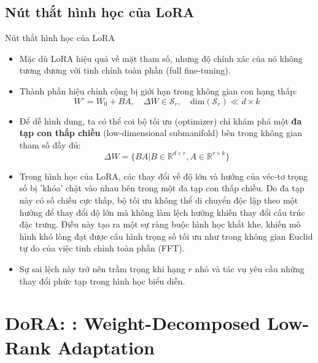 \documentclass[11pt,aspectratio=169]{beamer}
\begin{document}
\subsection{Nút thắt hình học của LoRA}
\begin{frame}[t]{Nút thắt hình học của LoRA}
\footnotesize

\begin{itemize}
    \item Mặc dù LoRA hiệu quả về mặt tham số, nhưng độ chính xác của nó không tương đương với tinh chỉnh toàn phần (full fine-tuning).
    \item Thành phần hiệu chỉnh cộng bị giới hạn trong không gian con hạng thấp:
    $$
        W' = W_0 + BA, \quad \Delta W \in \mathcal{S}_r, \quad \text{dim}(\mathcal{S}_r) \ll d \times k
    $$
    \item Để dễ hình dung, ta có thể coi bộ tối ưu (optimizer) chỉ khám phá một \textbf{đa tạp con thấp chiều} (low-dimensional submanifold) bên trong không gian tham số đầy đủ:
    $$\Delta W = \{BA | B \in \mathbb{R}^{d \times r}, A \in \mathbb{R}^{r \times k}\}$$
    \item Trong hình học của LoRA, các thay đổi về độ lớn và hướng của véc-tơ trọng số bị 'khóa' chặt vào nhau bên trong một đa tạp con thấp chiều. Do đa tạp này có số chiều cực thấp, bộ tối ưu không thể di chuyển độc lập theo một hướng để thay đổi độ lớn mà không làm lệch hướng khiến thay đổi cấu trúc đặc trưng. Điều này tạo ra một sự ràng buộc hình học khắt khe, khiến mô hình khó lòng đạt được cấu hình trọng số tối ưu như trong không gian Euclid tự do của việc tinh chỉnh toàn phần (FFT).
    \item Sự sai lệch này trở nên trầm trọng khi hạng $r$ nhỏ và tác vụ yêu cầu những thay đổi phức tạp trong hình học biểu diễn.
\end{itemize}
\end{frame}

\section{DoRA: : Weight-Decomposed Low-Rank Adaptation}
\end{document}

